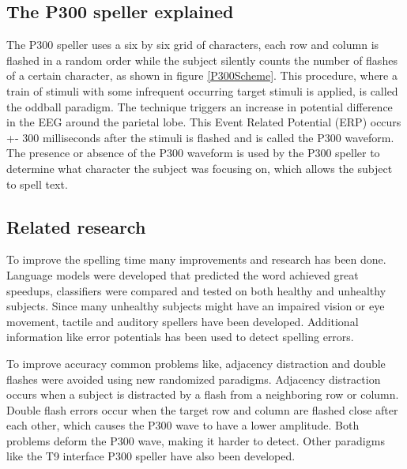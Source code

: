 \subsection{The P300 speller explained}
The P300 speller uses a six by six grid of characters, each row and column is flashed in a random order while the subject silently counts the number of flashes of a certain character, as shown in figure \ref{P300Scheme}. This procedure, where a train of stimuli with some infrequent occurring target stimuli is applied, is called the oddball paradigm. The technique triggers an increase in potential difference in the EEG around the parietal lobe. This Event Related Potential (ERP) occurs +- 300 milliseconds after the stimuli is flashed and is called the P300 waveform\cite{ComparisonClassifications}. The presence or absence of the P300 waveform is used by the P300 speller to determine what character the subject was focusing on, which allows the subject to spell text. 


\subsection{Related research}
To improve the spelling time many improvements and research has been done. Language models were developed that predicted the word achieved great speedups\cite{LangModel}, classifiers were compared and tested on both healthy\cite{ClassTechniqueComp} and unhealthy subjects\cite{ComparisonClassifications}. Since many unhealthy subjects might have an impaired vision or eye movement, tactile\cite{TactileP300} and auditory\cite{AuditoryP300} spellers have been developed. Additional information like error potentials has been used to detect spelling errors\cite{ErrorPotentials}. 

\npar

To improve accuracy common problems like, adjacency distraction and double flashes were avoided using new randomized paradigms\cite{PaperThibault}. Adjacency distraction occurs when a subject is distracted by a flash from a neighboring row or column. Double flash errors occur when the target row and column are flashed close after each other, which causes the P300 wave to have a lower amplitude. Both problems deform the P300 wave, making it harder to detect. Other paradigms like the T9 interface P300 speller have also been developed\cite{P300T9}.


